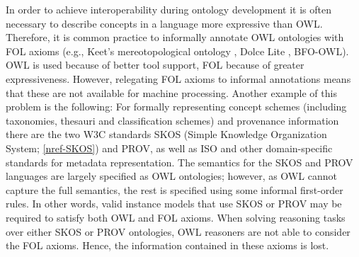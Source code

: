 \documentclass[10pt, a4paper]{isov2}
\renewcommand{\noterefname}{note}
\renewcommand{\nref}[1]{\noterefname~\ref{#1}}
\renewcommand{\nref}[1]{\ref{nref-#1}}
\begin{document}
In order to achieve interoperability during ontology development it is often necessary to describe 
concepts in a language more expressive than OWL.  Therefore, it is common practice to informally 
annotate OWL ontologies with FOL axioms (e.g., Keet's mereotopological ontology \cite{KeetEtAl12}, 
Dolce Lite \cite{dolce-web}, BFO-OWL). OWL is used because of better tool support, FOL because of 
greater expressiveness. However, relegating FOL axioms to  informal annotations means that these 
are not available for machine processing.  Another example of this problem is the following: For 
formally representing concept schemes (including taxonomies, thesauri and classification schemes) 
and provenance information there are the two W3C standards SKOS (Simple Knowledge Organization 
System; \nref{SKOS}) and PROV, as well as ISO and other domain-specific  standards for 
metadata representation. The semantics for the SKOS and PROV languages are largely specified as OWL 
ontologies; however, as OWL cannot capture the full semantics, the rest is specified using some 
informal first-order rules. In other words, valid instance models that use SKOS or PROV may be 
required to satisfy both OWL and FOL axioms. When solving reasoning tasks over either SKOS or PROV 
ontologies, OWL reasoners are not able to consider the  FOL axioms. Hence, the information 
contained in these axioms is lost.
\end{document}
